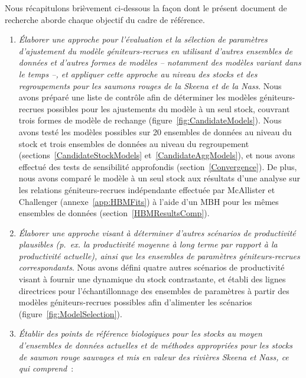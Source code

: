\documentclass[french,11pt]{book}
\begin{document}
Nous récapitulons brièvement ci-dessous la façon dont le présent document de recherche aborde chaque objectif du cadre de référence.
\begin{enumerate}
\def\labelenumi{\arabic{enumi}.}

\item
  \emph{Élaborer une approche pour l'évaluation et la sélection de paramètres d'ajustement du modèle géniteurs-recrues en utilisant d'autres ensembles de données et d'autres formes de modèles -- notamment des modèles variant dans le temps --, et appliquer cette approche au niveau des stocks et des regroupements pour les saumons rouges de la Skeena et de la Nass}. Nous avons préparé une liste de contrôle afin de déterminer les modèles géniteurs-recrues possibles pour les ajustements du modèle à un seul stock, couvrant trois formes de modèle de rechange (figure~\ref{fig:CandidateModels}). Nous avons testé les modèles possibles sur 20 ensembles de données au niveau du stock et trois ensembles de données au niveau du regroupement (sections~\ref{CandidateStockModels} et~\ref{CandidateAggModels}), et nous avons effectué des tests de sensibilité approfondis (section~\ref{Convergence}). De plus, nous avons comparé le modèle à un seul stock aux résultats d'une analyse sur les relations géniteurs-recrues indépendante effectuée par McAllister et Challenger (annexe~\ref{app:HBMFits}) à l'aide d'un MBH pour les mêmes ensembles de données (section~\ref{HBMResultsComp}).
\item
  \emph{Élaborer une approche visant à déterminer d'autres scénarios de productivité plausibles (p.~ex. la productivité moyenne à long terme par rapport à la productivité actuelle), ainsi que les ensembles de paramètres géniteurs-recrues correspondants}. Nous avons défini quatre autres scénarios de productivité visant à fournir une dynamique du stock contrastante, et établi des lignes directrices pour l'échantillonnage des ensembles de paramètres à partir des modèles géniteurs-recrues possibles afin d'alimenter les scénarios (figure~\ref{fig:ModelSelection}).
\item
  \emph{Établir des points de référence biologiques pour les stocks au moyen d'ensembles de données actuelles et de méthodes appropriées pour les stocks de saumon rouge sauvages et mis en valeur des rivières Skeena et Nass, ce qui comprend}~:
  \begin{enumerate}
  \def\labelenumii{\alph{enumii}.}


\end{enumerate}
\end{enumerate}
\end{document}
